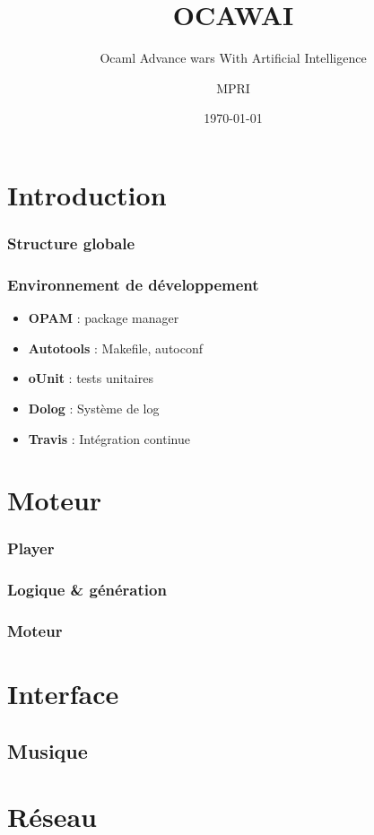 \documentclass[french,xcolor={usenames,dvipsnames}]{beamer}
\author{MPRI}
\date{\today}
\title{OCAWAI}
\subtitle{Ocaml Advance wars With Artificial Intelligence}
\newenvironment{bitemize}{\begin{itemize}[<+->]}{\end{itemize}}
\begin{document}
\begin{frame}
\titlepage
\end{frame}


\section{Introduction}

\begin{frame}
\frametitle{Structure globale}

\end{frame}


\begin{frame}
\frametitle{Environnement de développement}

\begin{bitemize}
  \item \textbf{OPAM} : package manager
  \item \textbf{Autotools} : Makefile, autoconf
  \item \textbf{oUnit} : tests unitaires
  \item \textbf{Dolog} : Système de log
  \item \textbf{Travis} : Intégration continue
\end{bitemize}
\end{frame}

\section{Moteur}

\begin{frame}
\frametitle{Player}
\end{frame}

\begin{frame}
\frametitle{Logique \& génération}
\end{frame}


\begin{frame}
\frametitle{Moteur}
\end{frame}


\section{Interface}

\subsection{Musique}
\section{Réseau}
\end{document}
